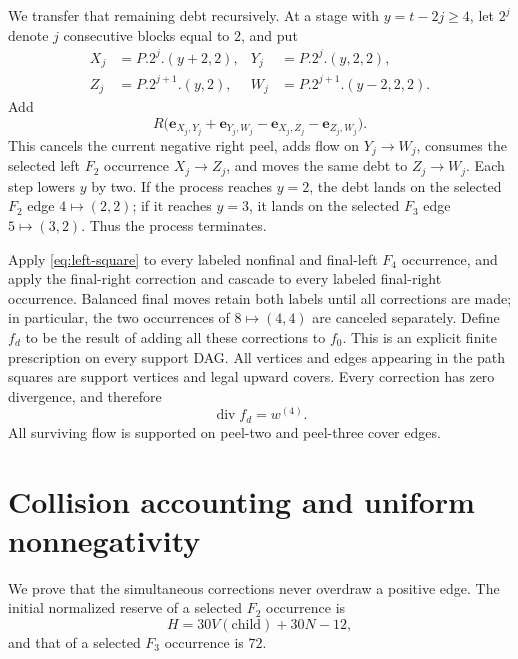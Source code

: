 \documentclass[11pt]{amsart}
\theoremstyle{definition}
\theoremstyle{remark}
\newcommand{\divg}{\operatorname{div}}
\newcommand{\edge}[2]{\mathbf e_{#1,#2}}
\begin{document}
We transfer that remaining debt recursively.  At a stage with
$y=t-2j\ge4$, let $2^j$ denote $j$ consecutive blocks equal to $2$,
and put
\begin{equation}
 \begin{aligned}
 X_j&=P.2^j.(y+2,2),&Y_j&=P.2^j.(y,2,2),\\
 Z_j&=P.2^{j+1}.(y,2),&W_j&=P.2^{j+1}.(y-2,2,2).
 \end{aligned}
 \label{eq:cascade-vertices}
\end{equation}
Add
\begin{equation}
 R\bigl(\edge{X_j}{Y_j}+\edge{Y_j}{W_j}
       -\edge{X_j}{Z_j}-\edge{Z_j}{W_j}\bigr).
 \label{eq:cascade-square}
\end{equation}
This cancels the current negative right peel, adds flow on
$Y_j\to W_j$, consumes the selected left $F_2$ occurrence
$X_j\to Z_j$, and moves the same debt to $Z_j\to W_j$.  Each step lowers
$y$ by two.  If the process reaches $y=2$, the debt lands on the selected
$F_2$ edge $4\mapsto(2,2)$; if it reaches $y=3$, it lands on the
selected $F_3$ edge $5\mapsto(3,2)$.  Thus the process terminates.

Apply \eqref{eq:left-square} to every labeled nonfinal and final-left
$F_4$ occurrence, and apply the final-right correction and cascade to every
labeled final-right occurrence.  Balanced final moves retain both labels
until all corrections are made; in particular, the two occurrences of
$8\mapsto(4,4)$ are canceled separately.  Define $f_d$ to be the
result of adding all these corrections to $f_0$.  This is an explicit
finite prescription on every support DAG.  All vertices and edges appearing
in the path squares are support vertices and legal upward covers.  Every
correction has zero divergence, and therefore
\begin{equation}
 \divg f_d=w^{(4)}.
 \label{eq:corrected-divergence}
\end{equation}
All surviving flow is supported on peel-two and peel-three cover edges.

\section{Collision accounting and uniform nonnegativity}
\label{sec:nonnegative}

We prove that the simultaneous corrections never overdraw a positive edge.
The initial normalized reserve of a selected $F_2$ occurrence is
\begin{equation}
 H=30V(\text{child})+30N-12,
 \label{eq:F2-reserve}
\end{equation}
and that of a selected $F_3$ occurrence is $72$.
\end{document}
